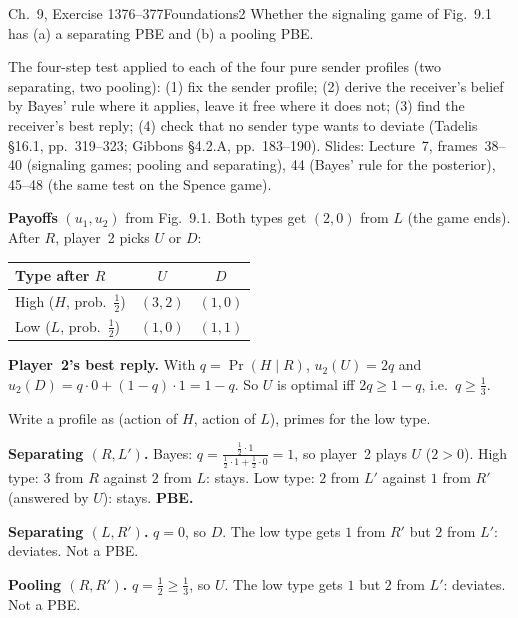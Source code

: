 \begin{exsol}{\MG{} Ch.~9, Exercise 1}{376--377}{Foundations}{2}
\asked Whether the signaling game of Fig.~9.1 has (a) a separating PBE and (b) a pooling PBE.

\method The four-step test applied to each of the four pure sender profiles (two separating, two
pooling): (1) fix the sender profile; (2) derive the receiver's belief by Bayes' rule where it applies,
leave it free where it does not; (3) find the receiver's best reply; (4) check that no sender type wants
to deviate (Tadelis \S16.1, pp.~319--323; Gibbons \S4.2.A, pp.~183--190). Slides: Lecture~7, frames~38--40
(signaling games; pooling and separating), 44 (Bayes' rule for the posterior), 45--48 (the same test on
the Spence game).

\solution
\textbf{Payoffs} $(u_1, u_2)$ from Fig.~9.1. Both types get $(2, 0)$ from $L$ (the game ends). After $R$,
player~2 picks $U$ or $D$:
\begin{center}
\begin{tabular}{lcc}
\toprule
Type after $R$ & $U$ & $D$ \\
\midrule
High ($H$, prob.\ $\frac12$) & $(3, 2)$ & $(1, 0)$ \\
Low ($L$, prob.\ $\frac12$) & $(1, 0)$ & $(1, 1)$ \\
\bottomrule
\end{tabular}
\end{center}
\textbf{Player~2's best reply.} With $q = \Pr(H \mid R)$, $u_2(U) = 2q$ and $u_2(D) = q \cdot 0 + (1-q) \cdot 1
= 1 - q$. So $U$ is optimal iff $2q \ge 1 - q$, i.e.\ $q \ge \frac13$.

Write a profile as (action of $H$, action of $L$), primes for the low type.

\textbf{Separating $(R, L')$.} Bayes: $q = \frac{\frac12 \cdot 1}{\frac12 \cdot 1 + \frac12 \cdot 0} = 1$, so
player~2 plays $U$ ($2 > 0$). High type: $3$ from $R$ against $2$ from $L$: stays. Low type: $2$ from $L'$
against $1$ from $R'$ (answered by $U$): stays. \textbf{PBE.}

\textbf{Separating $(L, R')$.} $q = 0$, so $D$. The low type gets $1$ from $R'$ but $2$ from $L'$: deviates.
Not a PBE.

\textbf{Pooling $(R, R')$.} $q = \frac12 \ge \frac13$, so $U$. The low type gets $1$ but $2$ from $L'$:
deviates. Not a PBE.


\end{exsol}
